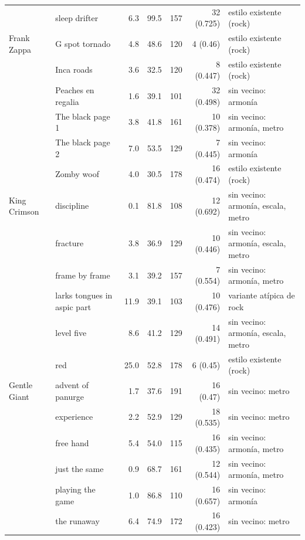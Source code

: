 {\begin{longtable}{@{}llrrrr>{\raggedright\arraybackslash}p{3.9cm}@{}}
   & sleep drifter & 6.3 & 99.5 & 157 & 32 (0.725) & estilo existente (rock) \\
  Frank Zappa & G spot tornado & 4.8 & 48.6 & 120 & 4 (0.46) & estilo existente (rock) \\
   & Inca roads & 3.6 & 32.5 & 120 & 8 (0.447) & estilo existente (rock) \\
   & Peaches en regalia & 1.6 & 39.1 & 101 & 32 (0.498) & sin vecino: armonía \\
   & The black page 1 & 3.8 & 41.8 & 161 & 10 (0.378) & sin vecino: armonía, metro \\
   & The black page 2 & 7.0 & 53.5 & 129 & 7 (0.445) & sin vecino: armonía \\
   & Zomby woof & 4.0 & 30.5 & 178 & 16 (0.474) & estilo existente (rock) \\
  King Crimson & discipline & 0.1 & 81.8 & 108 & 12 (0.692) & sin vecino: armonía, escala, metro \\
   & fracture & 3.8 & 36.9 & 129 & 10 (0.446) & sin vecino: armonía, escala, metro \\
   & frame by frame & 3.1 & 39.2 & 157 & 7 (0.554) & sin vecino: armonía, metro \\
   & larks tongues in aspic part & 11.9 & 39.1 & 103 & 10 (0.476) & variante atípica de rock \\
   & level five & 8.6 & 41.2 & 129 & 14 (0.491) & sin vecino: armonía, escala, metro \\
   & red & 25.0 & 52.8 & 178 & 6 (0.45) & estilo existente (rock) \\
  Gentle Giant & advent of panurge & 1.7 & 37.6 & 191 & 16 (0.47) & sin vecino: metro \\
   & experience & 2.2 & 52.9 & 129 & 18 (0.535) & sin vecino: metro \\
   & free hand & 5.4 & 54.0 & 115 & 16 (0.435) & sin vecino: armonía, metro \\
   & just the same & 0.9 & 68.7 & 161 & 12 (0.544) & sin vecino: armonía, metro \\
   & playing the game & 1.0 & 86.8 & 110 & 16 (0.657) & sin vecino: armonía \\
   & the runaway & 6.4 & 74.9 & 172 & 16 (0.423) & sin vecino: metro \\
\end{longtable}
}
